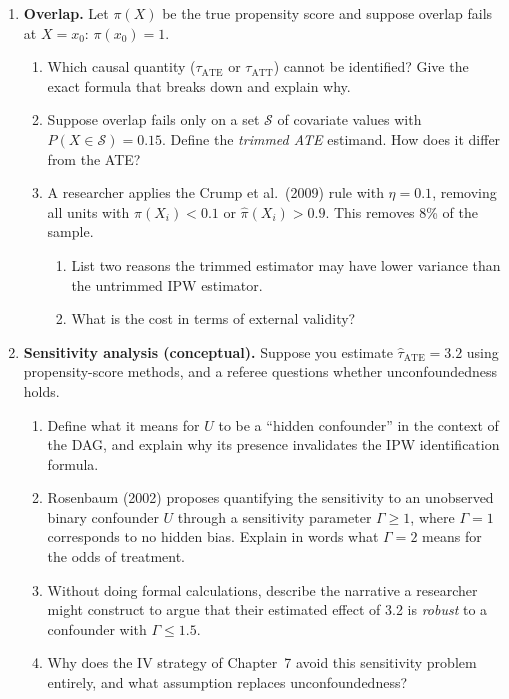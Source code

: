 \documentclass[master.tex]{subfiles}
\begin{document}
\begin{enumerate}
\item \textbf{Overlap.}
  Let $\pi(X)$ be the true propensity score and suppose overlap fails at
  $X = x_0$: $\pi(x_0) = 1$.
  \begin{enumerate}
    \item Which causal quantity ($\tau_{\mathrm{ATE}}$ or
      $\tau_{\mathrm{ATT}}$) cannot be identified?  Give the exact
      formula that breaks down and explain why.
    \item Suppose overlap fails only on a set $\mathcal{S}$ of covariate
      values with $P(X \in \mathcal{S}) = 0.15$.  Define the
      \emph{trimmed ATE} estimand.  How does it differ from the ATE?
    \item A researcher applies the Crump et al.\ (2009) rule with
      $\eta = 0.1$, removing all units with $\hat\pi(X_i) < 0.1$ or
      $\hat\pi(X_i) > 0.9$.  This removes 8\% of the sample.
      \begin{enumerate}
        \item[(i)] List two reasons the trimmed estimator may have
          lower variance than the untrimmed IPW estimator.
        \item[(ii)] What is the cost in terms of external validity?
      \end{enumerate}
  \end{enumerate}

\item \textbf{Sensitivity analysis (conceptual).}
  Suppose you estimate $\hat\tau_{\mathrm{ATE}} = 3.2$ using
  propensity-score methods, and a referee questions whether
  unconfoundedness holds.
  \begin{enumerate}
    \item Define what it means for $U$ to be a ``hidden confounder'' in
      the context of the DAG, and explain why its presence invalidates
      the IPW identification formula.
    \item Rosenbaum (2002) proposes quantifying the sensitivity to an
      unobserved binary confounder $U$ through a sensitivity parameter
      $\Gamma \ge 1$, where $\Gamma = 1$ corresponds to no hidden bias.
      Explain in words what $\Gamma = 2$ means for the odds of
      treatment.
    \item Without doing formal calculations, describe the narrative a
      researcher might construct to argue that their estimated effect of
      3.2 is \emph{robust} to a confounder with $\Gamma \le 1.5$.
    \item Why does the IV strategy of Chapter~7 avoid this sensitivity
      problem entirely, and what assumption replaces unconfoundedness?
  \end{enumerate}


\end{enumerate}
\end{document}

